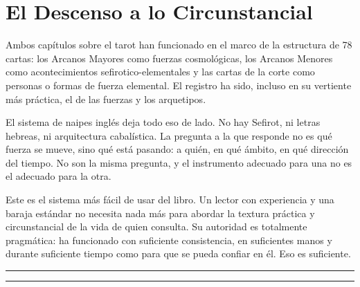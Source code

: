 \section{El Descenso a lo Circunstancial}\label{between-chapters-two-and-three}

Ambos capítulos sobre el tarot han funcionado en el marco de la estructura de 78 cartas: los Arcanos Mayores como fuerzas cosmológicas, los Arcanos Menores como acontecimientos sefirotico-elementales y las cartas de la corte como personas o formas de fuerza elemental. El registro ha sido, incluso en su vertiente más práctica, el de las fuerzas y los arquetipos.

El sistema de naipes inglés deja todo eso de lado. No hay Sefirot, ni letras hebreas, ni arquitectura cabalística. La pregunta a la que responde no es qué fuerza se mueve, sino qué está pasando: a quién, en qué ámbito, en qué dirección del tiempo. No son la misma pregunta, y el instrumento adecuado para una no es el adecuado para la otra.

Este es el sistema más fácil de usar del libro. Un lector con experiencia y una baraja estándar no necesita nada más para abordar la textura práctica y circunstancial de la vida de quien consulta. Su autoridad es totalmente pragmática: ha funcionado con suficiente consistencia, en suficientes manos y durante suficiente tiempo como para que se pueda confiar en él. Eso es suficiente.

\begin{center}\rule{0.5\linewidth}{0.5pt}\end{center}

\begin{center}\rule{0.5\linewidth}{0.5pt}\end{center}
